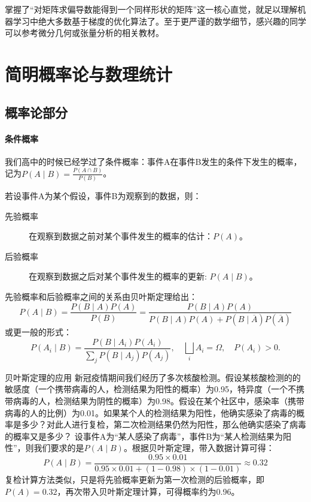 掌握了“对矩阵求偏导数能得到一个同样形状的矩阵”这一核心直觉，就足以理解机器学习中绝大多数基于梯度的优化算法了。至于更严谨的数学细节，感兴趣的同学可以参考微分几何或张量分析的相关教材。

\section{简明概率论与数理统计}

\subsection{概率论部分}

\paragraph{条件概率}

我们高中的时候已经学过了条件概率：事件A在事件B发生的条件下发生的概率，记为$P(A \mid B) = \frac{P(A \cap B)}{P(B)}$。

若设事件A为某个假设，事件B为观察到的数据，则：
\begin{description}
    \item[先验概率] 在观察到数据之前对某个事件发生的概率的估计：$P(A)$。
    \item[后验概率] 在观察到数据之后对某个事件发生的概率的更新: $P(A \mid B)$。
\end{description}

先验概率和后验概率之间的关系由贝叶斯定理给出：
\begin{equation}
    P(A \mid B) = \frac{P(B \mid A)P(A)}{P(B)} = \frac{P(B \mid A)P(A)}{P(B \mid A)P(A) + P(B \mid \overline{A})P(\overline{A})}
\end{equation}
或更一般的形式：
\begin{equation}
    P(A_i \mid B) = \frac{P(B \mid A_i)P(A_i)}{\sum_j P(B \mid A_j)P(A_j)}, \quad \bigsqcup_i A_i = \Omega, \quad P(A_i) > 0.
\end{equation}

\begin{example}{贝叶斯定理的应用}{}
    新冠疫情期间我们经历了多次核酸检测。假设某核酸检测的的敏感度（一个携带病毒的人，检测结果为阳性的概率）为0.95，特异度（一个不携带病毒的人，检测结果为阴性的概率）为0.98。假设在某个社区中，感染率（携带病毒的人的比例）为0.01。如果某个人的检测结果为阳性，他确实感染了病毒的概率是多少？对此人进行复检，第二次检测结果仍然为阳性，那么他确实感染了病毒的概率又是多少？
    \tcblower
    设事件A为“某人感染了病毒”，事件B为“某人检测结果为阳性”，则我们要求的是$P(A \mid B)$。根据贝叶斯定理，带入数据计算可得：
    \begin{equation}
        P(A \mid B) = \frac{0.95 \times 0.01}{0.95 \times 0.01 + (1 - 0.98) \times (1 - 0.01)} \approx 0.32
    \end{equation}
    复检计算方法类似，只是将先验概率更新为第一次检测的后验概率，即$P(A) = 0.32$，再次带入贝叶斯定理计算，可得概率约为0.96。
\end{example}

